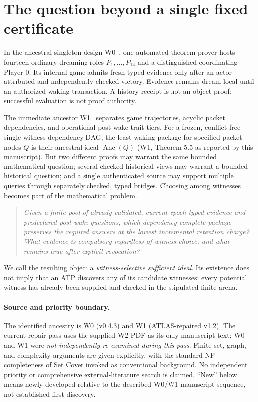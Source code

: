 \documentclass[10pt,letterpaper]{article}
\theoremstyle{definition}
\theoremstyle{remark}
\newcommand{\Anc}{\operatorname{Anc}}
\begin{document}
\section{The question beyond a single fixed certificate}\label{gl-first-W2-s1}
In the ancestral singleton design W0~\cite{W0}, one automated theorem prover hosts fourteen ordinary dreaming roles $P_1,\dots,P_{14}$ and a distinguished coordinating Player 0. Its internal game admits fresh typed evidence only after an actor-attributed and independently checked victory. Evidence remains dream-local until an authorized waking transaction. A history receipt is not an object proof; successful evaluation is not proof authority.

The immediate ancestor W1~\cite{W1} separates game trajectories, acyclic packet dependencies, and operational post-wake trait tiers. For a frozen, conflict-free single-witness dependency DAG, the least waking package for specified packet nodes $Q$ is their ancestral ideal $\Anc(Q)$ (W1, Theorem 5.5 as reported by this manuscript). But two different proofs may warrant the same bounded mathematical question; several checked historical views may warrant a bounded historical question; and a single authenticated source may support multiple queries through separately checked, typed bridges. Choosing among witnesses becomes part of the mathematical problem.

\begin{quote}\itshape
Given a finite pool of already validated, current-epoch typed evidence and predeclared post-wake questions, which dependency-complete package preserves the required answers at the lowest incremental retention charge? What evidence is compulsory regardless of witness choice, and what remains true after explicit revocation?
\end{quote}

We call the resulting object a \emph{witness-selective sufficient ideal}. Its existence does not imply that an ATP discovers any of its candidate witnesses: every potential witness has already been supplied and checked in the stipulated finite arena.

\paragraph{Source and priority boundary.} The identified ancestry is W0 (v0.4.3) and W1 (ATLAS-repaired v1.2). The current repair pass uses the supplied W2 PDF as its only manuscript text; W0 and W1 were \emph{not independently re-examined during this pass}. Finite-set, graph, and complexity arguments are given explicitly, with the standard NP-completeness of Set Cover invoked as conventional background. No independent priority or comprehensive external-literature search is claimed. ``New'' below means newly developed relative to the described W0/W1 manuscript sequence, not established first discovery.
\end{document}
